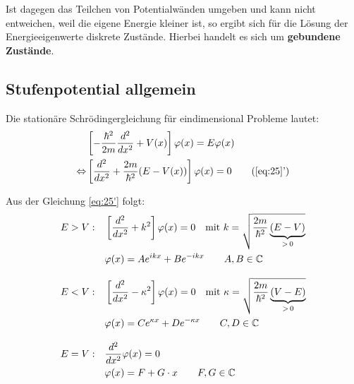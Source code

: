 Ist dagegen das Teilchen von Potentialwänden umgeben und kann nicht entweichen, weil die eigene Energie kleiner ist, so ergibt sich für die Lösung der Energieeigenwerte diskrete Zustände. Hierbei handelt es sich um \textbf{gebundene Zustände}.

\subsection{Stufenpotential allgemein}

Die stationäre Schrödingergleichung für eindimensional Probleme lautet:
\begin{align} 
  &\left[-\frac{\hbar^2}{2m}\frac{d^2}{dx^2}+V(x)\right]\varphi(x)
  =E\varphi(x)\label{eq:25}\\
  \Leftrightarrow &\left[\frac{d^2}{dx^2} 
    +\frac{2m}{\hbar^2}(E-V(x))\right]\varphi(x)=0 
  \tag{\ref{eq:25}'}\label{eq:25'} 
\end{align}

Aus der Gleichung \eqref{eq:25'} folgt:
\begin{subequations}
  \label{eq:27}
  \begin{align}
    E>V: \quad &\left[\frac{d^2}{dx^2}+k^2\right]\varphi(x)=0 
    \quad \textrm{mit } k=\sqrt{\frac{2m}{\hbar^2}\underbrace{(E-V)}_{>\,0}} \notag \\
    &\varphi(x)=Ae^{ikx}+Be^{-ikx}  
    \qquad  A,B \in \mathbb{C} \label{eq:27a} \\[2ex]
    E<V: \quad &\left[\frac{d^2}{dx^2}-\kappa^2\right]\varphi(x)=0
    \quad  \textrm{mit } \kappa=\sqrt{\frac{2m}{\hbar^2}\underbrace{(V-E)}_{>\,0}} \notag \\
    &\varphi(x)=Ce^{\kappa x}+De^{-\kappa x}  
    \qquad  C,D \in \mathbb{C} \label{eq:27b}\\[2ex]
    E=V: \quad &\frac{d^2}{dx^2}\varphi(x)=0 \notag \\
    &\varphi(x)=F+G\cdot x   
    \qquad  F,G \in \mathbb{C} \label{eq:27c}
  \end{align}
\end{subequations}

